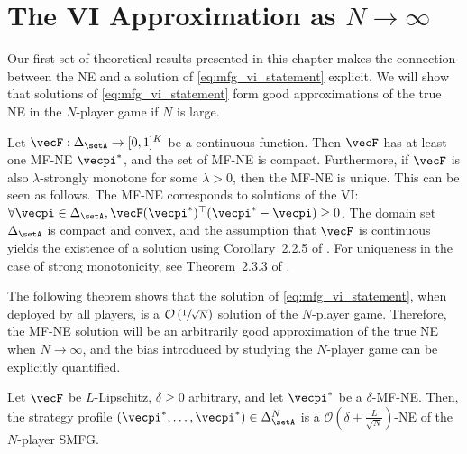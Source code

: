 
\section{The VI Approximation as $N\rightarrow\infty$}\label{sec:theoretical_tool}

Our first set of theoretical results presented in this chapter makes the connection between the NE and a solution of \eqref{eq:mfg_vi_statement} explicit.
We will show that solutions of \eqref{eq:mfg_vi_statement} form good approximations of the true NE in the $N$-player game if $N$ is large.

\begin{remark}
\label{remark:vi_existence}
Let $\vecF:\Delta_\setA \rightarrow [0,1]^K$ be a continuous function.
Then $\vecF$ has at least one MF-NE $\vecpi^*$, and the set of MF-NE is compact.
Furthermore, if $\vecF$ is also $\lambda$-strongly monotone for some $\lambda > 0$, then the MF-NE is unique.
This can be seen as follows.
The MF-NE corresponds to solutions of the VI: $\forall \vecpi \in \Delta_\setA, \vecF(\vecpi^*)^\top (\vecpi^* - \vecpi) \geq 0$.
The domain set $\Delta_\setA$ is compact and convex, and the assumption that $\vecF$ is continuous yields the existence of a solution using Corollary~2.2.5 of \cite{facchinei2003finite}.
For uniqueness in the case of strong monotonicity, see Theorem~2.3.3 of \cite{facchinei2003finite}.
\end{remark}








The following theorem shows that the solution of \eqref{eq:mfg_vi_statement}, when deployed by all players, is a $\mathcal{O}\left(\sfrac{1}{\sqrt{N}}\right)$ solution of the $N$-player game.
Therefore, the MF-NE solution will be an arbitrarily good approximation of the true NE when $N\rightarrow\infty$, and the bias introduced by studying the $N$-player game can be explicitly quantified.

\begin{theorem}\label{theorem:mfg_ne}
    Let $\vecF$ be $L$-Lipschitz, $\delta\geq 0$ arbitrary, and let $\vecpi^*$ be a $\delta$-MF-NE.
Then, the strategy profile $(\vecpi^*, \ldots, \vecpi^*) \in \Delta_\setA^N$ is a $\mathcal{O}\left(\delta + \frac{L}{\sqrt{N}}\right)$-NE of the $N$-player SMFG. 
\end{theorem}

